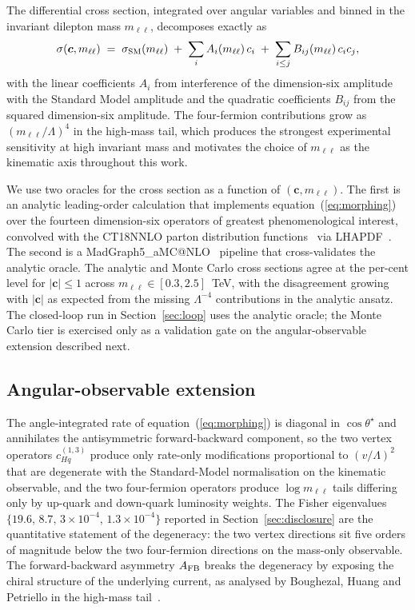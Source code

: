 \documentclass[11pt,a4paper]{article}
\newcommand{\Lam}{\Lambda}
\newcommand{\mll}{m_{\ell\ell}}
\newcommand{\sigsm}{\sigma_{\rm SM}}
\begin{document}
The differential cross section, integrated over angular variables and binned in the invariant dilepton mass $\mll$, decomposes exactly as
\begin{equation}
  \sigma(\bm{c}, \mll) \;=\; \sigsm(\mll) \;+\; \sum_{i} A_i(\mll)\, c_i \;+\; \sum_{i \leq j} B_{ij}(\mll)\, c_i c_j,
  \label{eq:morphing}
\end{equation}
with the linear coefficients $A_i$ from interference of the dimension-six amplitude with the Standard Model amplitude and the quadratic coefficients $B_{ij}$ from the squared dimension-six amplitude. The four-fermion contributions grow as $(\mll / \Lam)^4$ in the high-mass tail, which produces the strongest experimental sensitivity at high invariant mass and motivates the choice of $\mll$ as the kinematic axis throughout this work.

We use two oracles for the cross section as a function of $(\bm{c}, \mll)$. The first is an analytic leading-order calculation that implements equation~(\ref{eq:morphing}) over the fourteen dimension-six operators of greatest phenomenological interest, convolved with the CT18NNLO parton distribution functions~\cite{Hou:2019ct18} via LHAPDF~\cite{Buckley:2014lhapdf}. The second is a MadGraph5\_aMC@NLO~\cite{Alwall:2014mg5} pipeline that cross-validates the analytic oracle. The analytic and Monte Carlo cross sections agree at the per-cent level for $|\bm{c}| \leq 1$ across $\mll \in [0.3, 2.5]$~TeV, with the disagreement growing with $|\bm{c}|$ as expected from the missing $\Lam^{-4}$ contributions in the analytic ansatz. The closed-loop run in Section~\ref{sec:loop} uses the analytic oracle; the Monte Carlo tier is exercised only as a validation gate on the angular-observable extension described next.

\subsection{Angular-observable extension}
\label{sec:angular-oracle}

The angle-integrated rate of equation~(\ref{eq:morphing}) is diagonal in $\cos\theta^\star$ and annihilates the antisymmetric forward-backward component, so the two vertex operators $c_{Hq}^{(1,3)}$ produce only rate-only modifications proportional to $(v/\Lam)^2$ that are degenerate with the Standard-Model normalisation on the kinematic observable, and the two four-fermion operators produce $\log\mll$ tails differing only by up-quark and down-quark luminosity weights. The Fisher eigenvalues $\{19.6,\,8.7,\,3\times10^{-4},\,1.3\times10^{-4}\}$ reported in Section~\ref{sec:disclosure} are the quantitative statement of the degeneracy: the two vertex directions sit five orders of magnitude below the two four-fermion directions on the mass-only observable. The forward-backward asymmetry $A_{\rm FB}$ breaks the degeneracy by exposing the chiral structure of the underlying current, as analysed by Boughezal, Huang and Petriello in the high-mass tail~\cite{Boughezal:2023afb}.
\end{document}
